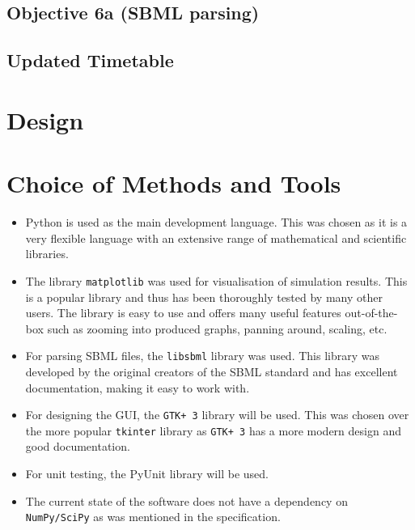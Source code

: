 \documentclass{article}
\begin{document}
	\subsection{Objective 6a (SBML parsing)} 
	
	
	\subsection{Updated Timetable}
	
	
	
	\section{Design}		%
	
	\section{Choice of Methods and Tools}
	\begin{itemize}
		\item Python is used as the main development language. This was chosen as it is a very flexible language with an extensive range of mathematical and scientific libraries.
		\item The library \verb|matplotlib| was used for visualisation of simulation results. This is a popular library and thus has been thoroughly tested by many other users. The library is easy to use and offers many useful features out-of-the-box such as zooming into produced graphs, panning around, scaling, etc.
		\item For parsing SBML files, the \verb|libsbml| library was used. This library was developed by the original creators of the SBML standard and has excellent documentation, making it easy to work with.
		\item For designing the GUI, the \verb|GTK+ 3| library will be used. This was chosen over the more popular \verb|tkinter| library as \verb|GTK+ 3| has a more modern design and good documentation.
		\item For unit testing, the PyUnit library will be used.
		\item The current state of the software does not have a dependency on \verb|NumPy/SciPy| as was mentioned in the specification.
	\end{itemize}
	
	
	
\end{document}
